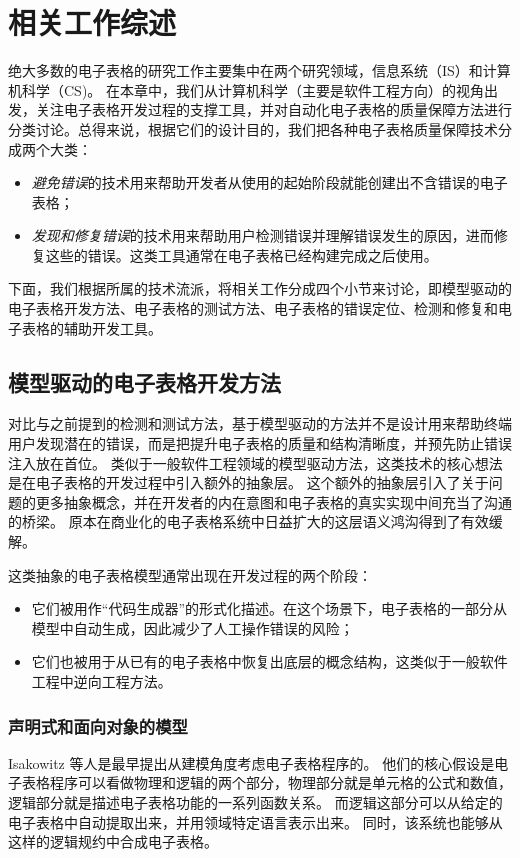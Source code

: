 \chapter{相关工作综述}
绝大多数的电子表格的研究工作主要集中在两个研究领域，信息系统（IS）和计算机科学（CS)。
在本章中，我们从计算机科学（主要是软件工程方向）的视角出发，关注电子表格开发过程的支撑工具，并对自动化电子表格的质量保障方法进行分类讨论。总得来说，根据它们的设计目的，我们把各种电子表格质量保障技术分成两个大类：
\begin{itemize}
    \item \textit{避免错误}的技术用来帮助开发者从使用的起始阶段就能创建出不含错误的电子表格；
    \item \textit{发现和修复错误}的技术用来帮助用户检测错误并理解错误发生的原因，进而修复这些的错误。这类工具通常在电子表格已经构建完成之后使用。
\end{itemize}

下面，我们根据所属的技术流派，将相关工作分成四个小节来讨论，即模型驱动的电子表格开发方法、电子表格的测试方法、电子表格的错误定位、检测和修复和电子表格的辅助开发工具。


\section{模型驱动的电子表格开发方法}

对比与之前提到的检测和测试方法，基于模型驱动的方法并不是设计用来帮助终端用户发现潜在的错误，而是把提升电子表格的质量和结构清晰度，并预先防止错误注入放在首位。
类似于一般软件工程领域的模型驱动方法，这类技术的核心想法是在电子表格的开发过程中引入额外的抽象层。
这个额外的抽象层引入了关于问题的更多抽象概念，并在开发者的内在意图和电子表格的真实实现中间充当了沟通的桥梁。
原本在商业化的电子表格系统中日益扩大的这层语义鸿沟\cite{luckey2012systematic}得到了有效缓解。

这类抽象的电子表格模型通常出现在开发过程的两个阶段：
\begin{itemize}
    \item 它们被用作“代码生成器”的形式化描述。在这个场景下，电子表格的一部分从模型中自动生成，因此减少了人工操作错误的风险；
    \item 它们也被用于从已有的电子表格中恢复出底层的概念结构，这类似于一般软件工程中逆向工程方法。
\end{itemize}

\subsection{声明式和面向对象的模型}
Isakowitz 等人\cite{isakowitz1995toward}是最早提出从建模角度考虑电子表格程序的。
他们的核心假设是电子表格程序可以看做物理和逻辑的两个部分，物理部分就是单元格的公式和数值，逻辑部分就是描述电子表格功能的一系列函数关系。
而逻辑这部分可以从给定的电子表格中自动提取出来，并用领域特定语言表示出来。
同时，该系统也能够从这样的逻辑规约中合成电子表格。

